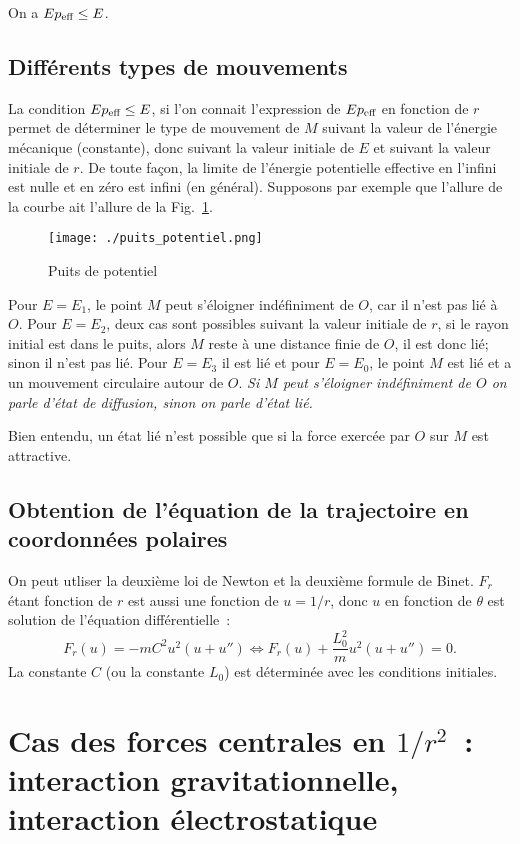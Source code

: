 On a \(Ep_{\textmd{eff}} \leq E\).

\subsection{Différents types de mouvements}
La condition \(Ep_{\textmd{eff}} \leq E\), si l'on connait l'expression de 
\(Ep_{\textmd{eff}}\) en fonction de \(r\) permet de déterminer le type de 
mouvement de \(M\) suivant la valeur de l'énergie mécanique (constante), donc 
suivant la valeur initiale de \(E\) et suivant la valeur initiale de \(r\). De 
toute façon, la limite de l'énergie potentielle effective en l'infini est nulle 
et en zéro est infini (en général). Supposons par exemple que l'allure de la 
courbe ait l'allure de la Fig.~\ref{fig:puits_potentiel}.

\begin{figure}
  \centering
  \texttt{[image: ./puits\_potentiel.png]}
  \caption{Puits de potentiel}\label{fig:puits_potentiel}
\end{figure}

Pour \(E = E_1\), le point \(M\) peut s'éloigner indéfiniment de \(O\), car il 
n'est pas lié à \(O\). Pour \(E=E_2\), deux cas sont possibles suivant la 
valeur initiale de \(r\), si le rayon initial est dans le puits, alors \(M\) 
reste à une distance finie de \(O\), il est donc lié; sinon il n'est pas lié.
Pour \(E=E_3\) il est lié et pour \(E=E_0\), le point \(M\) est lié et a un
mouvement circulaire autour de \(O\). \emph{Si \(M\) peut s'éloigner 
indéfiniment de \(O\) on parle d'état de diffusion, sinon on parle d'état lié.}

Bien entendu, un état lié n'est possible que si la force exercée par \(O\) sur 
\(M\) est attractive.

\subsection{Obtention de l'équation de la trajectoire en coordonnées polaires}
On peut utliser la deuxième loi de Newton et la deuxième formule de Binet. 
\(F_r\) étant fonction de \(r\) est aussi une fonction de \(u = 1/r\), donc 
\(u\) en fonction de \(\theta\) est solution de l'équation différentielle~:
\begin{equation}
  F_r(u) = -mC^2u^2(u+u'') \iff F_r(u) + \frac{L_0^2}{m}u^2(u+u'') = 0.
\end{equation}
La constante \(C\) (ou la constante \(L_0\)) est déterminée avec les conditions 
initiales.
\section{Cas des forces centrales en \(1/r^2\)~: interaction gravitationnelle,
interaction électrostatique}
